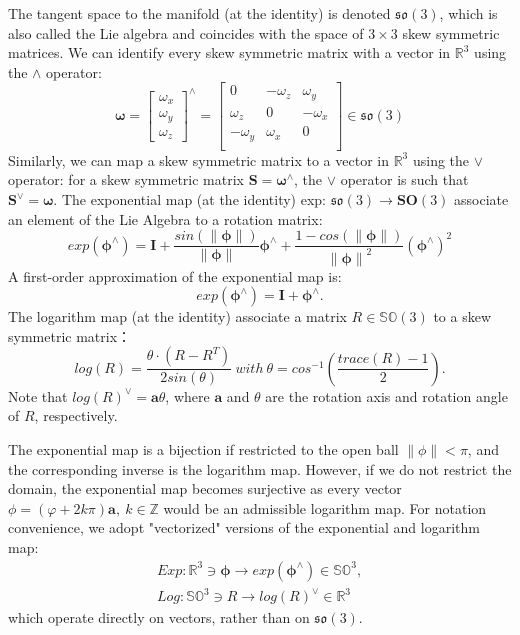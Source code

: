 \documentclass[a4paper]{report}
\begin{document}
The tangent space to the manifold (at the identity) is denoted $\mathfrak{so}(3)$, which is also called the Lie algebra and coincides with the space of $3 \times 3$ skew symmetric matrices. We can identify every skew symmetric matrix with a vector in $\mathbb{R}^3$ using the $\land$ operator:
\begin{equation}
\bm{\omega}=
\left[
\begin{matrix}
{\omega}_x \\ 
{\omega}_y \\ 
{\omega}_z
\end{matrix}
\right]^{\land}
=\left[
\begin{matrix}
0 & -\omega_z & \omega_y \\
\omega_z & 0 & -\omega_x \\ 
-\omega_y & \omega_x & 0 \\
\end{matrix}
\right]
\in \mathfrak{so}(3)
\end{equation}
Similarly, we can map a skew symmetric matrix to a vector in $\mathbb{R}^3$ using the $\vee$ operator: for a skew symmetric matrix $\mathbf{S}=\bm{\omega}^{\land}$, the $\vee$ operator is such that $\mathbf{S}^{\vee}=\bm{\omega}$. The exponential map (at the identity) exp: $\mathfrak{so}(3) \to \mathbf{SO}(3)$ associate an element of the Lie Algebra to a rotation matrix:
\begin{equation}
exp(\bm{\phi}^{\land})=
\bm{I}+\frac{sin(\parallel \bm{\phi} \parallel)}{\parallel \bm{\phi} \parallel}\bm{\phi}^{\land}+\frac{1-cos(\parallel \bm{\phi} \parallel)}{{\parallel \bm{\phi} \parallel}^2
}(\bm{\phi^{\land}})^{2} 
\end{equation}
A first-order approximation of the exponential map is:
\begin{equation}
exp(\bm{\phi}^{\land})=\bm{I}+\bm{{\phi}^{\land}}.
\end{equation}
The logarithm map (at the identity) associate a matrix $R \in \mathbb{SO}(3)$ to a skew symmetric matrix：
\begin{equation}
log(R)=\frac{\theta \cdot (R-R^T)}{2sin(\theta)}\ with\ \theta=cos^{-1}(\frac{trace(R)-1}{2}).
\end{equation}
Note that $log(R)^\vee = \bm{a}\theta$, where $\bm{a}$ and $\theta$ are the rotation axis and rotation angle of $R$, respectively.

The exponential map is a bijection if restricted to the open ball $\parallel\phi\parallel < \pi$, and the corresponding inverse is the logarithm map. However, if we do not restrict the domain, the exponential map becomes surjective as every vector $\phi = (\varphi+2k\pi)\bm{a},\ k \in \mathbb{Z}$ would be an admissible logarithm map.
For notation convenience, we adopt "vectorized" versions of the exponential and logarithm map:
\begin{equation}
\left.
\begin{matrix}
Exp: \mathbb{R}^3 \ni \bm{\phi} \to exp(\bm{\phi}^{\land}) \in \mathbb{SO}^3, \\
Log: \mathbb{SO}^3 \ni R \to log(R)^{\vee} \in \mathbb{R}^3
\end{matrix}
\right.
\end{equation}
which operate directly on vectors, rather than on $\mathfrak{so}(3)$.
\end{document}
